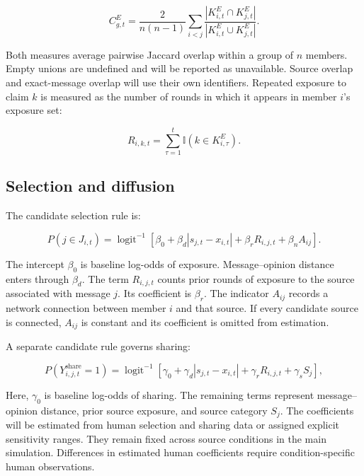 \documentclass[11pt,a4paper]{article}
\begin{document}
\begin{equation*}
C^{E}_{g,t}
=
\frac{2}{n(n-1)}
\sum_{i<j}
\frac{|K^{E}_{i,t}\cap K^{E}_{j,t}|}
{|K^{E}_{i,t}\cup K^{E}_{j,t}|}.
\end{equation*}

Both measures average pairwise Jaccard overlap within a group of $n$ members. Empty unions are undefined and will be reported as unavailable. Source overlap and exact-message overlap will use their own identifiers. Repeated exposure to claim $k$ is measured as the number of rounds in which it appears in member $i$'s exposure set:

\begin{equation*}
R_{i,k,t}
=
\sum_{\tau=1}^{t}
\mathbb I(k\in K^{E}_{i,\tau}).
\end{equation*}

\subsection{Selection and diffusion}

The candidate selection rule is:

\begin{equation*}
P(j\in J_{i,t})
=
\operatorname{logit}^{-1}
\left[
\beta_0
+
\beta_d|s_{j,t}-x_{i,t}|
+
\beta_rR_{i,j,t}
+
\beta_nA_{ij}
\right].
\end{equation*}

The intercept $\beta_0$ is baseline log-odds of exposure. Message--opinion distance enters through $\beta_d$. The term $R_{i,j,t}$ counts prior rounds of exposure to the source associated with message $j$. Its coefficient is $\beta_r$. The indicator $A_{ij}$ records a network connection between member $i$ and that source. If every candidate source is connected, $A_{ij}$ is constant and its coefficient is omitted from estimation.

A separate candidate rule governs sharing:

\begin{equation*}
P(Y_{i,j,t}^{\text{share}}=1)
=
\operatorname{logit}^{-1}
\left[
\gamma_0
+
\gamma_d|s_{j,t}-x_{i,t}|
+
\gamma_rR_{i,j,t}
+
\gamma_sS_j
\right],
\end{equation*}

Here, $\gamma_0$ is baseline log-odds of sharing. The remaining terms represent message--opinion distance, prior source exposure, and source category $S_j$. The coefficients will be estimated from human selection and sharing data or assigned explicit sensitivity ranges. They remain fixed across source conditions in the main simulation. Differences in estimated human coefficients require condition-specific human observations.
\end{document}
